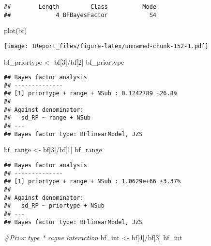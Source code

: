 \documentclass[
]{article}
\newenvironment{Shaded}{\begin{snugshade}}{\end{snugshade}}
\newcommand{\CommentTok}[1]{\textcolor[rgb]{0.56,0.35,0.01}{\textit{#1}}}
\newcommand{\DecValTok}[1]{\textcolor[rgb]{0.00,0.00,0.81}{#1}}
\newcommand{\FunctionTok}[1]{\textcolor[rgb]{0.00,0.00,0.00}{#1}}
\newcommand{\NormalTok}[1]{#1}
\newcommand{\OtherTok}[1]{\textcolor[rgb]{0.56,0.35,0.01}{#1}}
\newcommand{\SpecialCharTok}[1]{\textcolor[rgb]{0.00,0.00,0.00}{#1}}
\begin{document}
\begin{verbatim}
##        Length         Class          Mode 
##             4 BFBayesFactor            S4
\end{verbatim}

\begin{Shaded}
\begin{Highlighting}[]
\FunctionTok{plot}\NormalTok{(bf)}
\end{Highlighting}
\end{Shaded}

\texttt{[image: 1Report\_files/figure-latex/unnamed-chunk-152-1.pdf]}

\begin{Shaded}
\begin{Highlighting}[]
\NormalTok{ bf\_priortype }\OtherTok{\textless{}{-}}\NormalTok{ bf[}\DecValTok{3}\NormalTok{]}\SpecialCharTok{/}\NormalTok{bf[}\DecValTok{2}\NormalTok{]}
\NormalTok{ bf\_priortype}
\end{Highlighting}
\end{Shaded}

\begin{verbatim}
## Bayes factor analysis
## --------------
## [1] priortype + range + NSub : 0.1242789 ±26.8%
## 
## Against denominator:
##   sd_RP ~ range + NSub 
## ---
## Bayes factor type: BFlinearModel, JZS
\end{verbatim}

\begin{Shaded}
\begin{Highlighting}[]
\NormalTok{bf\_range }\OtherTok{\textless{}{-}}\NormalTok{ bf[}\DecValTok{3}\NormalTok{]}\SpecialCharTok{/}\NormalTok{bf[}\DecValTok{1}\NormalTok{]}
\NormalTok{bf\_range}
\end{Highlighting}
\end{Shaded}

\begin{verbatim}
## Bayes factor analysis
## --------------
## [1] priortype + range + NSub : 1.0629e+66 ±3.37%
## 
## Against denominator:
##   sd_RP ~ priortype + NSub 
## ---
## Bayes factor type: BFlinearModel, JZS
\end{verbatim}

\begin{Shaded}
\begin{Highlighting}[]
\CommentTok{\#Prior type * ragne interaction }
\NormalTok{bf\_int }\OtherTok{\textless{}{-}}\NormalTok{ bf[}\DecValTok{4}\NormalTok{]}\SpecialCharTok{/}\NormalTok{bf[}\DecValTok{3}\NormalTok{]}
\NormalTok{bf\_int}
\end{Highlighting}
\end{Shaded}
\end{document}
